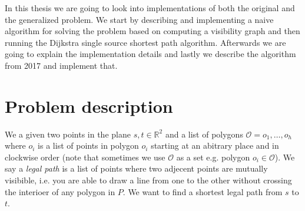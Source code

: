 In this thesis we are going to look into implementations of both the original
and the generalized problem. We start by describing and implementing a naive algorithm for solving
the problem based on computing a visibility graph and then running the Dijkstra
single source shortest path algorithm. Afterwards we are going to explain the
implementation details and lastly we describe the algorithm from 2017 and
implement that.

\section{Problem description} 
\label{problemdescription}
We a given two points in the plane $s,t\in\mathbb{R}^2$ and a list of polygons
$\mathcal{O}=o_1,\dots,o_h$ where $o_i$ is a list of points in polygon $o_i$
starting at an abitrary place and in clockwise order (note that sometimes we
use $\mathcal{O}$ as a set e.g. polygon $o_i \in \mathcal{O}$). We say a
\emph{legal path} is a list of points where two adjecent points are mutually
visibible, i.e. you are able to draw a line from one to the other without
crossing the interioer of any polygon in $P$.  We want to find a shortest legal
path from $s$ to $t$.

